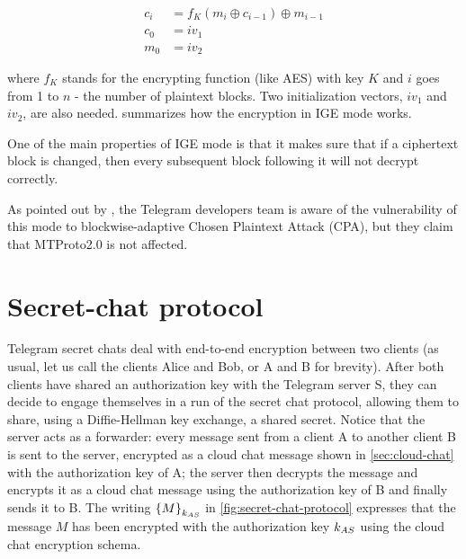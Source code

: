 \begin{equation}
\begin{aligned}
    c_i &= f_K(m_i \oplus c_{i-1}) \oplus m_{i-1} \\
    c_0 &= iv_1 \\
    m_0 &= iv_2 
\end{aligned}
\end{equation}

where $f_K$ stands for the encrypting function (like AES) with key $K$
and $i$ goes from 1 to $n$ - the number of plaintext blocks. Two initialization vectors, $iv_1$ and $iv_2$, are also needed.  summarizes how the encryption in IGE mode works.


One of the main properties of IGE mode is that it makes sure that if a ciphertext block is changed, then every subsequent block following it will not decrypt correctly.

As pointed out by \cite{Telegram-AFAQ-IGE}, the Telegram developers team is aware of the vulnerability of this mode to blockwise-adaptive Chosen Plaintext Attack (CPA)\cite{IGE-CPA}, but they claim that MTProto2.0 is not affected.




\section{Secret-chat protocol}
\label{sec:secret-chat}

Telegram secret chats deal with end-to-end encryption between two clients (as usual, let us call the clients Alice and Bob, or A and B for brevity). After both clients have shared an authorization key with the Telegram server S, they can decide to engage themselves in a run of the secret chat protocol, allowing them to share, using a Diffie-Hellman key exchange, a shared secret. Notice that the server acts as a forwarder: every message sent from a client A to another client B is sent to the server, encrypted as a cloud chat message shown in \cref{sec:cloud-chat} with the authorization key of A; the server then decrypts the message and encrypts it as a cloud chat message using the authorization key of B and finally sends it to B. The writing $\left\{M\right\}_{k_{AS}}$ in \cref{fig:secret-chat-protocol} expresses that the message $M$ has been encrypted with the authorization key $k_{AS}$ using the cloud chat encryption schema.

